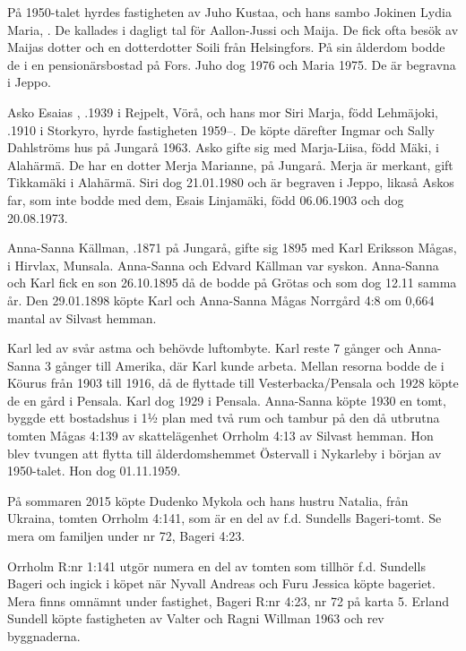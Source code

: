 
På 1950-talet hyrdes fastigheten av  Juho Kustaa,  och hans sambo Jokinen Lydia Maria, . De kallades i dagligt tal för Aallon-Jussi och Maija. De fick ofta besök av Maijas dotter och en dotterdotter Soili från Helsingfors. På sin ålderdom bodde de i en pensionärsbostad på Fors. Juho dog 1976 och Maria 1975. De är 	begravna i Jeppo.

Asko Esaias , .1939 i Rejpelt, Vörå, och hans mor Siri Marja, född Lehmäjoki, .1910 i Storkyro, hyrde fastigheten 1959--. De köpte därefter Ingmar och Sally Dahlströms hus på Jungarå 1963.	Asko gifte sig med Marja-Liisa, född Mäki,  i Alahärmä. De har en dotter Merja Marianne,  på Jungarå. Merja är merkant, gift Tikkamäki i Alahärmä. Siri dog 21.01.1980 och är begraven i Jeppo, likaså Askos far, som inte bodde med dem, Esais Linjamäki, född 06.06.1903 och dog 20.08.1973.


Anna-Sanna Källman, .1871 på Jungarå, gifte sig 1895 med Karl Eriksson Mågas,  i Hirvlax, Munsala. Anna-Sanna och Edvard Källman var syskon. Anna-Sanna och Karl fick en son 26.10.1895 då de bodde på Grötas och som dog 12.11 samma år. Den 29.01.1898 köpte Karl och Anna-Sanna Mågas Norrgård 4:8 om 0,664 mantal av Silvast hemman.

Karl led av svår astma och behövde luftombyte. Karl reste 7 gånger och Anna-Sanna 3 gånger till Amerika, där Karl kunde arbeta. Mellan resorna bodde de i Köurus från 1903 till 1916, då de flyttade till Vesterbacka/Pensala och 1928 köpte de en gård i Pensala. Karl dog 1929 i Pensala.	Anna-Sanna köpte 1930 en tomt, byggde ett bostadshus i 1½ plan med två rum och tambur på den då utbrutna	tomten Mågas 4:139 av skattelägenhet Orrholm 4:13 av Silvast hemman. Hon blev tvungen att flytta till ålderdomshemmet Östervall i Nykarleby i början av 1950-talet. Hon dog 01.11.1959.





På sommaren 2015 köpte Dudenko Mykola och hans hustru Natalia, från Ukraina, tomten Orrholm 4:141, som är en del av f.d. Sundells Bageri-tomt. Se mera om familjen under nr 72, Bageri 4:23.


Orrholm R:nr 1:141 utgör numera en del av tomten som tillhör  f.d. Sundells Bageri och ingick i köpet när  Nyvall Andreas och Furu Jessica köpte bageriet. Mera finns omnämnt under fastighet, Bageri R:nr 4:23, nr 72 på karta 5. Erland Sundell köpte fastigheten av Valter och Ragni Willman 1963 och rev byggnaderna.


